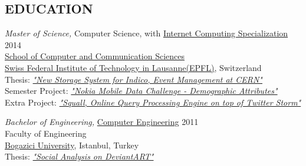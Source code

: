 \documentclass[line, margin]{res}
\begin{document}
\begin{resume}
\section{EDUCATION}
{\sl Master of Science,} Computer Science, with \href{http://ic.epfl.ch/specializations#content}{Internet Computing Specialization} \hfill{2014} \\
  \href{http://ic.epfl.ch}{School of Computer and Communication Sciences} \\
  \href{http://epfl.ch}{Swiss Federal Institute of Technology in Lausanne(EPFL)}, Switzerland \\
  Thesis: \textit{\href{http://indico-software.org/}{"New Storage System for Indico, Event Management at CERN"}} \\
  Semester Project: \textit{\href{http://research.nokia.com/page/12000}{"Nokia Mobile Data Challenge - Demographic Attributes"}} \\
  Extra Project: \textit{\href{https://github.com/epfldata/squall}{"Squall, Online Query Processing Engine on top of Twitter Storm"}}

{\sl Bachelor of Engineering,} \href{http://www.cmpe.boun.edu.tr/}{Computer Engineering} \hfill{2011} \\
  Faculty of Engineering \\
  \href{http://boun.edu.tr/en-US/Content/Default.aspx}{Bogazici University}, Istanbul, Turkey \\
  Thesis: \textit{\href{https://github.com/ferhatelmas/deviantART-analysis}{"Social Analysis on DeviantART"}}

\end{resume}
\end{document}
